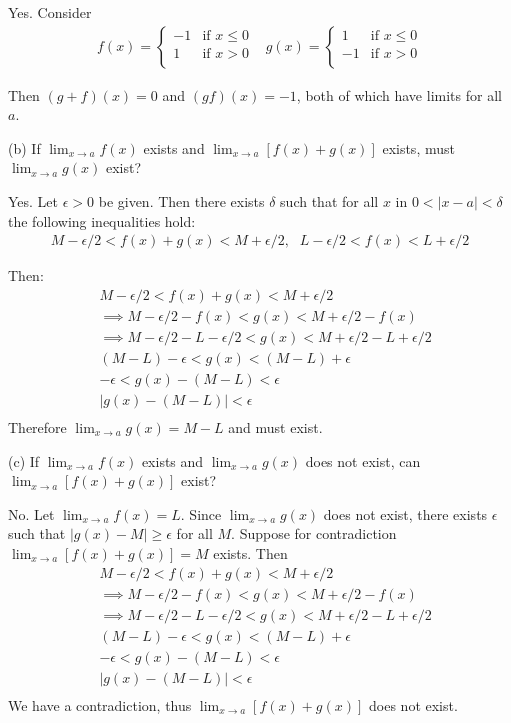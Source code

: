 \vs

Yes. Consider
\[\begin{array}{cc}
f(x)=\begin{cases}
    -1 & \text{if } x\leq0\\
    1 & \text{if } x>0\\
\end{cases}
&
g(x)=\begin{cases}
    1 & \text{if } x\leq0\\
    -1 & \text{if } x>0\\
\end{cases}
\end{array}\]

Then $(g+f)(x)=0$ and $(gf)(x)=-1$, both of which have limits for all $a$.

\vs

(b) If $\lim_{x\to a}f(x)$ exists and $\lim_{x\to a}[f(x)+g(x)]$ exists, must $\lim_{x\to a}g(x)$ exist?

\vs

Yes. Let $\epsilon>0$ be given. Then there exists $\delta$ such that for all $x$ in $0<|x-a|<\delta$ the following inequalities hold:
\[\begin{array}{cc}
M-\epsilon/2<f(x)+g(x)<M+\epsilon/2\text{,} & L-\epsilon/2<f(x)<L+\epsilon/2
\end{array}\]

Then:
\begin{align*}
    &M-\epsilon/2<f(x)+g(x)<M+\epsilon/2\\
    &\implies M-\epsilon/2-f(x)<g(x)<M+\epsilon/2-f(x)\\
    &\implies M-\epsilon/2-L-\epsilon/2<g(x)<M+\epsilon/2-L+\epsilon/2\\
    &(M-L)-\epsilon<g(x)<(M-L)+\epsilon\\
    &-\epsilon<g(x)-(M-L)<\epsilon\\
    &|g(x)-(M-L)|<\epsilon\\
\end{align*}
Therefore $\lim_{x\to a}g(x)=M-L$ and must exist.

\vs

(c) If $\lim_{x\to a}f(x)$ exists and $\lim_{x\to a}g(x)$ does not exist, can $\lim_{x\to a}[f(x)+g(x)]$ exist?

\vs

No. Let $\lim_{x\to a}f(x)=L$. Since $\lim_{x\to a}g(x)$ does not exist, there exists $\epsilon$ such that $|g(x)-M|\geq\epsilon$ for all $M$. Suppose for contradiction $\lim_{x\to a}[f(x)+g(x)]=M$ exists. Then
\begin{align*}
    &M-\epsilon/2<f(x)+g(x)<M+\epsilon/2\\
    &\implies M-\epsilon/2-f(x)<g(x)<M+\epsilon/2-f(x)\\
    &\implies M-\epsilon/2-L-\epsilon/2<g(x)<M+\epsilon/2-L+\epsilon/2\\
    &(M-L)-\epsilon<g(x)<(M-L)+\epsilon\\
    &-\epsilon<g(x)-(M-L)<\epsilon\\
    &|g(x)-(M-L)|<\epsilon\\
\end{align*}
We have a contradiction, thus $\lim_{x\to a}[f(x)+g(x)]$ does not exist.

